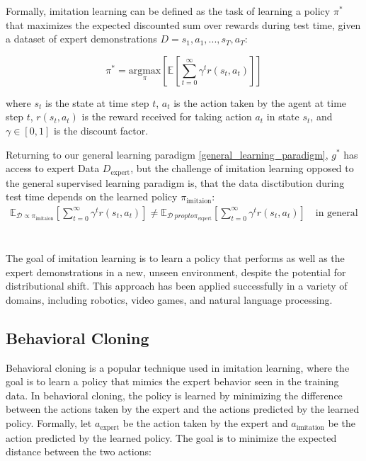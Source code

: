 Formally, imitation learning can be defined as the task of learning a policy $\pi^*$ that maximizes the expected discounted sum over rewards during test time, given a dataset of expert demonstrations $D = {s_1, a_1, ..., s_T, a_T}$:

\begin{equation}
    \pi^* = \underset{\pi}{\text{argmax}}\left[\mathbb{E} [\sum_{t=0}^{\infty} \gamma^t r(s_t, a_t)]\right]
\end{equation}

where $s_t$ is the state at time step $t$, $a_t$ is the action taken by the agent at time step $t$, $r(s_t, a_t)$ is the reward received for taking action $a_t$ in state $s_t$, and $\gamma \in [0,1]$ is the discount factor.

Returning to our general learning paradigm \ref{general_learning_paradigm}, $g^*$ has access to expert Data $D_{\text{expert}}$, but the challenge of imitation learning 
opposed to the general supervised learning paradigm is, that the data disctibution during test time depends on the learned policy $\pi_{\text{imitaion}}$:
\begin{align}
    \mathbb{E}_{\mathcal{D} \propto \pi_{\text{imitaion}}}[\sum_{t=0}^{\infty} \gamma^t r(s_t, a_t)] \neq \mathbb{E}_{\mathcal{D} \ propto \pi_{\text{expert}}}[\sum_{t=0}^{\infty} \gamma^t r(s_t, a_t)] \quad \text{in general}
\end{align}
\\ \\
The goal of imitation learning is to learn a policy that performs as well as the expert demonstrations in a new, unseen environment, despite 
the potential for distributional shift. This approach has been applied successfully in a variety of domains, including robotics, video games, 
and natural language processing.

\subsection{Behavioral Cloning}
Behavioral cloning is a popular technique used in imitation learning, where the goal is to learn a policy that mimics the expert behavior seen in 
the training data. In behavioral cloning, the policy is learned by minimizing the difference between the actions taken by the expert and the 
actions predicted by the learned policy. Formally, let $a_{\text{expert}}$ be the action taken by the expert and $a_{\text{imitation}}$ be the action 
predicted by the learned policy. The goal is to minimize the expected distance between the two actions:

